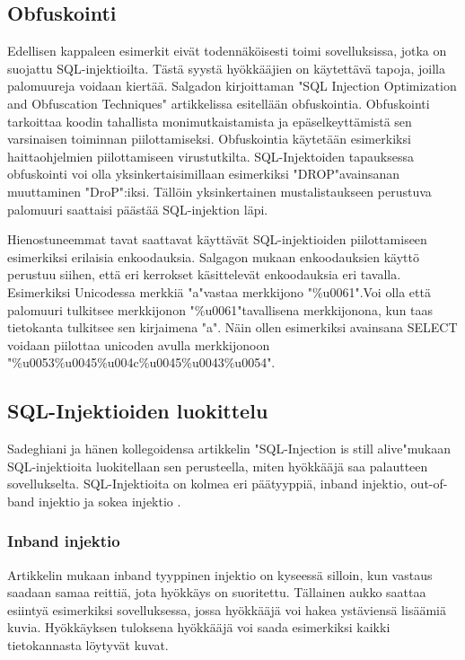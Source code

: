 \documentclass[finnish]{tktltiki2}
\theoremstyle{definition}
\theoremstyle{remark}
\begin{document}
	\subsection{Obfuskointi}
	
	Edellisen kappaleen esimerkit eivät todennäköisesti toimi sovelluksissa, jotka on suojattu SQL-injektioilta. Tästä syystä hyökkääjien on käytettävä tapoja, joilla palomuureja voidaan kiertää. Salgadon kirjoittaman "SQL Injection Optimization and Obfuscation Techniques"\space\cite{encoding} artikkelissa esitellään obfuskointia. Obfuskointi tarkoittaa koodin tahallista monimutkaistamista ja epäselkeyttämistä sen varsinaisen toiminnan piilottamiseksi. Obfuskointia käytetään esimerkiksi haittaohjelmien piilottamiseen virustutkilta. SQL-Injektoiden tapauksessa obfuskointi voi olla yksinkertaisimillaan esimerkiksi "DROP"\space avainsanan muuttaminen "DroP":iksi. Tällöin yksinkertainen mustalistaukseen perustuva palomuuri saattaisi päästää SQL-injektion läpi.
	
	Hienostuneemmat tavat saattavat käyttävät SQL-injektioiden piilottamiseen esimerkiksi erilaisia enkoodauksia. Salgagon mukaan enkoodauksien käyttö perustuu siihen, että eri kerrokset käsittelevät enkoodauksia eri tavalla. Esimerkiksi Unicodessa merkkiä "a"\space vastaa merkkijono "\%u0061".\space Voi olla että palomuuri tulkitsee merkkijonon "\%u0061"\space tavallisena merkkijonona, kun taas tietokanta tulkitsee sen kirjaimena "a". Näin ollen esimerkiksi avainsana SELECT voidaan piilottaa unicoden avulla merkkijonoon "\%u0053\%u0045\%u004c\%u0045\%u0043\%u0054".
	
	\subsection{SQL-Injektioiden luokittelu}
		Sadeghiani ja hänen kollegoidensa artikkelin "SQL-Injection is still alive"\space mukaan SQL-injektioita luokitellaan sen perusteella, miten
		 hyökkääjä saa palautteen sovellukselta. SQL-Injektioita on kolmea eri päätyyppiä, inband injektio, out-of-band injektio ja sokea injektio \cite{still-alive}.
	
	\subsubsection{Inband injektio}
	Artikkelin mukaan inband tyyppinen injektio on kyseessä silloin, kun vastaus saadaan samaa reittiä, jota hyökkäys on suoritettu. Tällainen aukko saattaa esiintyä esimerkiksi sovelluksessa, jossa hyökkääjä voi hakea ystäviensä lisäämiä kuvia. Hyökkäyksen tuloksena hyökkääjä voi saada esimerkiksi kaikki tietokannasta löytyvät kuvat.
	
\end{document}
